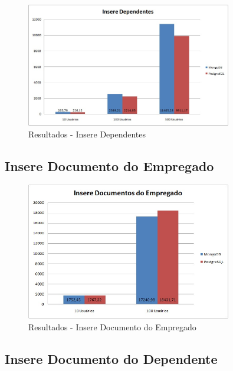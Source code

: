 \begin{figure}[!htbp]
	\begin{center}
		\includegraphics[width=0.8\textwidth]{resultados/insere_dependentes}
	\end{center}
	\caption{Resultados - Insere Dependentes}
	\label{fig:resultinseredependentes}
\end{figure}

\subsection{Insere Documento do Empregado}

\begin{figure}[!htbp]
	\begin{center}
		\includegraphics[width=0.8\textwidth]{resultados/insere_doc_empregado}
	\end{center}
	\caption{Resultados - Insere Documento do Empregado}
	\label{fig:resultinseredocempregado}
\end{figure}

\subsection{Insere Documento do Dependente}

